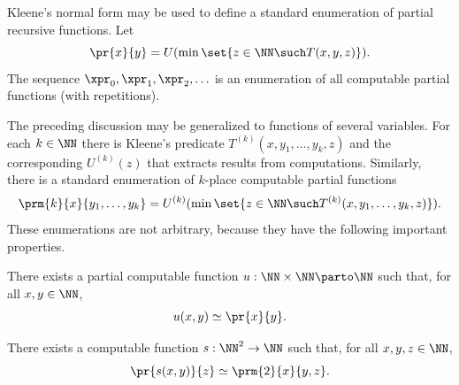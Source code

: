 Kleene's normal form may be used to define a standard enumeration of
partial recursive functions. Let
%
\begin{equation*}
  \pr{x}{y} = U(\min \set{z \in \NN \such T(x,y,z)}).
\end{equation*}
%
The sequence $\xpr_0, \xpr_1, \xpr_2, \ldots$ is an enumeration of all
computable partial functions (with repetitions).

The preceding discussion may be generalized to functions of several
variables. For each $k \in \NN$ there is Kleene's predicate
$T^{(k)}(x,y_1,\ldots,y_k,z)$ and the corresponding $U^{(k)}(z)$ that
extracts results from computations. Similarly, there is a standard
enumeration of $k$-place computable partial functions
%
\begin{equation*}
  \prm{k}{x}{y_1, \ldots, y_k} =
  U^{(k)}(\min \set{z \in \NN \such T^{(k)}(x,y_1, \ldots, y_k,z)}).
\end{equation*}
%
These enumerations are not arbitrary, because they have the following
important properties.

\begin{theorem}[utm]
  There exists a partial computable function $u : \NN \times
  \NN \parto \NN$ such that, for all $x, y \in \NN$,
  \begin{equation*}
    u(x,y) \simeq \pr{x}{y}.
  \end{equation*}
\end{theorem}

\begin{theorem}[smn]
  There exists a computable function $s :
  \NN^2 \to \NN$ such that, for all $x, y, z \in \NN$,
  \begin{equation*}
    \pr{s(x, y)}{z} \simeq \prm{2}{x}{y,z}.
  \end{equation*}
\end{theorem}

